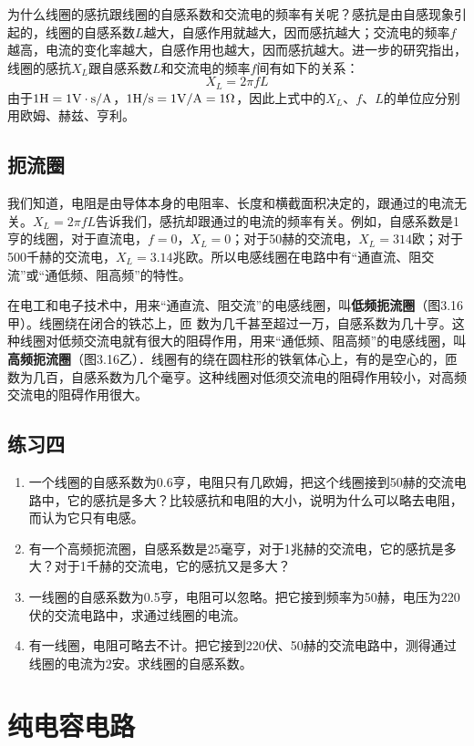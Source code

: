 为什么线圈的感抗跟线圈的自感系数和交流电的频率有关呢？感抗是由自感现象引起的，线圈的自感系数$L$越大，自感作用就越大，因而感抗越大；交流电的频率$f$越高，电流的变化率越大，自感作用也越大，因而感抗越大。进一步的研究指出，线圈的感抗$X_L$跟自感系数$L$和交流电的频率$f$间有如下的关系：
\[X_L=2\pi fL\]
由于$1{\rm H}=1{\rm V\cdot s/A}$，$1{\rm H/s}=1{\rm V/A}=1\Omega$，因此上式中的$X_L$、$f$、$L$的单位应分别用欧姆、赫兹、亨利。

\subsection{扼流圈}

我们知道，电阻是由导体本身的电阻率、长度和横截面积决定的，跟通过的电流无关。$X_L=2\pi fL$告诉我们，感抗却跟通过的电流的频率有关。例如，自感系数是1亨的线圈，对于直流电，$f=0$，$X_L=0$；对于50赫的交流电，$X_L=314$欧；对于500千赫的交流电，$X_L=3.14$兆欧。所以电感线圈在电路中有“通直流、阻交流”或“通低频、阻高频”的特性。

在电工和电子技术中，用来“通直流、阻交流”的电感线圈，叫\textbf{低频扼流圈}（图3.16甲）。线圈绕在闭合的铁芯上，匝
数为几千甚至超过一万，自感系数为几十亨。这种线圈对低频交流电就有很大的阻碍作用，用来“通低频、阻高频”的电感线圈，叫\textbf{高频扼流圈}（图3.16乙）．线圈有的绕在圆柱形的铁氧体心上，有的是空心的，匝数为几百，自感系数为几个毫亨。这种线圈对低须交流电的阻碍作用较小，对高频交流电的阻碍作用很大。

\subsection*{练习四}
\begin{enumerate}
    \item 一个线圈的自感系数为0.6亨，电阻只有几欧姆，把这个线圈接到50赫的交流电路中，它的感抗是多大？比较感抗和电阻的大小，说明为什么可以略去电阻，而认为它只有电感。
    \item 有一个高频扼流圈，自感系数是25毫亨，对于1兆赫的交流电，它的感抗是多大？对于1千赫的交流电，它的感抗又是多大？
    \item 一线圈的自感系数为0.5亨，电阻可以忽略。把它接到频率为50赫，电压为220伏的交流电路中，求通过线圈的电流。
    \item 有一线圈，电阻可略去不计。把它接到220伏、50赫的交流电路中，测得通过线圈的电流为2安。求线圈的自感系数。
\end{enumerate}
	
\section{纯电容电路}
